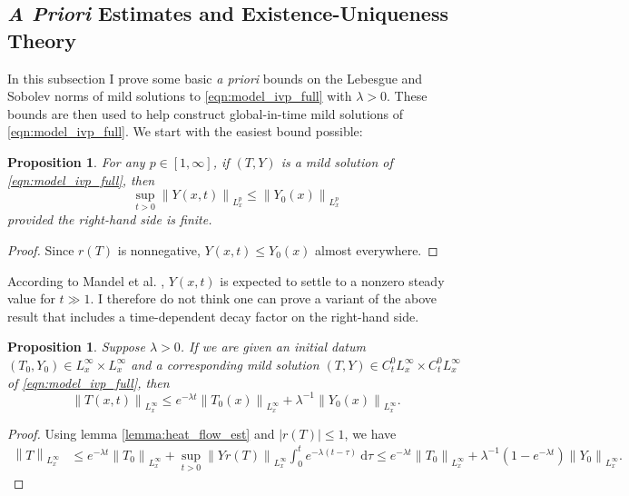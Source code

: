 \documentclass[twosided, 12pt]{article}
\numberwithin{equation}{section}
\theoremstyle{plain}
\newtheorem{prop}[thm]{Proposition}
\newcommand{\diff}{\mathrm{d}}
\begin{document}
\subsection{\textit{A Priori} Estimates and Existence-Uniqueness Theory}
\noindent In this subsection I prove some basic \textit{a priori} bounds on the Lebesgue and Sobolev norms of mild solutions to \eqref{eqn:model_ivp_full} with $\lambda>0$. These bounds are then used to help construct global-in-time mild solutions of \eqref{eqn:model_ivp_full}. We start with the easiest bound possible: 
\begin{prop} \label{prop:fuel_decay} For any $p\in [1,\infty]$, if $(T,Y)$ is a mild solution of \eqref{eqn:model_ivp_full}, then 
\begin{equation}
    \sup_{t>0}\left\|Y(x,t)\right\|_{L^p_{x}} \leq  \left\|Y_0(x)\right\|_{L^p_{x}}
\end{equation}
provided the right-hand side is finite.
\end{prop}
\begin{proof}
Since $r(T)$ is nonnegative, $Y(x,t)\leq Y_0(x)$ almost everywhere. 
\end{proof}
\noindent According to Mandel et al. \cite[\S 4.1]{Mandel_etal_2008}, $Y(x,t)$ is expected to settle to a nonzero steady value for $t\gg 1$. I therefore do not think one can prove a variant of the above result that includes a time-dependent decay factor on the right-hand side. 
\begin{prop}\label{prop:linfty_est}
Suppose $\lambda>0$. If we are given an initial datum $(T_0, Y_0)\in L^{\infty}_{x}\times L^{\infty}_{x}$ and a corresponding mild solution $(T,Y)\in C^{0}_{t}L^{\infty}_{x}\times C^{0}_{t}L^{\infty}_{x}$ of \eqref{eqn:model_ivp_full}, then 
\begin{equation}
 \left\|T(x,t)\right\|_{L^{\infty}_{x}} \leq e^{-\lambda t}\left\|T_0(x)\right\|_{L^{\infty}_{x}} + \lambda^{-1}\left\|Y_0(x)\right\|_{L^{\infty}_{x}}. 
\end{equation}
\end{prop}
\begin{proof}
    Using lemma \ref{lemma:heat_flow_est} and $\left|r(T)\right|\leq 1$, we have
    \begin{align*}
        \left\|T\right\|_{L^{\infty}_{x}} &\leq e^{-\lambda t} \left\|T_0\right\|_{L^{\infty}_{x}} + \sup_{t>0}\left\|Y r\left(T\right)\right\|_{L^\infty_x}\int_0^t e^{-\lambda \left(t-\tau\right)} \ \diff \tau
        \leq e^{-\lambda t} \left\|T_0\right\|_{L^{\infty}_{x}} + \lambda^{-1}\left(1-e^{-\lambda t}\right)\left\|Y_0\right\|_{L^\infty_x}. 
    \end{align*}
\end{proof}
\end{document}
